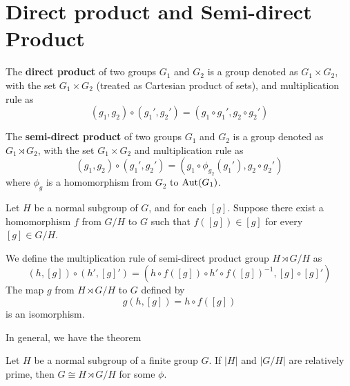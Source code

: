 \documentclass[12pt]{book}
\begin{document}
\section{Direct product and Semi-direct Product}
\begin{definition}
	The {\bf direct product} of two groups $G_1$ and $G_2$ is a group denoted as $G_1\times G_2$, with the set $G_1\times G_2$ (treated as Cartesian product of sets), and multiplication rule as
	\begin{equation}
		(g_1,g_2)\circ(g_1',g_2')=(g_1\circ g_1',g_2\circ g_2')
	\end{equation}
\end{definition}
\begin{definition}
	The {\bf semi-direct product} of two groups $G_1$ and $G_2$ is a group denoted as $G_1\rtimes G_2$, with the set $G_1\times G_2$ and multiplication rule as
	\begin{equation}
		(g_1,g_2)\circ(g_1',g_2')=(g_1\circ \phi_{g_2}(g_1'),g_2\circ g_2')
	\end{equation}
	where $\phi_{g}$ is a homomorphism from $G_2$ to ${\rm Aut}(G_1)$.
\end{definition}
\begin{lemma}
	Let $H$ be a normal subgroup of $G$, and for each $[g]$. Suppose there exist a homomorphism $f$ from $G/H$ to $G$ such that $f([g])\in[g]$ for every $[g]\in G/H$.
	
	We define the multiplication rule of semi-direct product group $H\rtimes G/H$ as
	\begin{equation}
		(h,[g])\circ(h',[g]')=(h\circ f([g])\circ h'\circ f([g])^{-1},[g]\circ [g]')
	\end{equation}
	The map $g$ from $H\rtimes G/H$ to $G$ defined by
		\begin{equation}
			g(h,[g])=h\circ f([g])
		\end{equation}
		is an isomorphism.
\end{lemma}
	In general, we have the theorem
	\begin{theorem}
		Let $H$ be a normal subgroup of a finite group $G$. If $|H|$ and $|G/H|$ are relatively prime, then $G\cong H\rtimes G/H$ for some $\phi$.
	\end{theorem}
	
\end{document}
